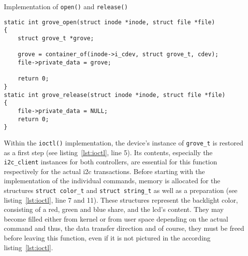 \begin{listing} [H]
    \caption{Implementation of \texttt{open()} and \texttt{release()}}
    \label{lst:open}
    \begin{verbatim}
static int grove_open(struct inode *inode, struct file *file)
{
    struct grove_t *grove;

    grove = container_of(inode->i_cdev, struct grove_t, cdev);
    file->private_data = grove;

    return 0;
}
static int grove_release(struct inode *inode, struct file *file)
{
    file->private_data = NULL;
    return 0;
}
    \end{verbatim}
\end{listing}

Within the \texttt{ioctl()} implementation, the device's instance of \texttt{grove_t} is restored as a first step (see listing~\ref{lst:ioctl}, line 5).
Its contents, especially the \texttt{i2c_client} instances for both controllers, are essential for this function respectively for the actual \ac{i2c} transactions.
Before starting with the implementation of the individual commands, memory is allocated for the structures \texttt{struct color_t} and \texttt{struct string_t} as well as a preparation (see listing~\ref{lst:ioctl}, line 7 and 11).
These structures represent the backlight color, consisting of a red, green and blue share, and the \ac{lcd}'s content.
They may become filled either from kernel or from user space depending on the actual command and thus, the data transfer direction and of course, they must be freed before leaving this function, even if it is not pictured in the according listing~\ref{lst:ioctl}.

